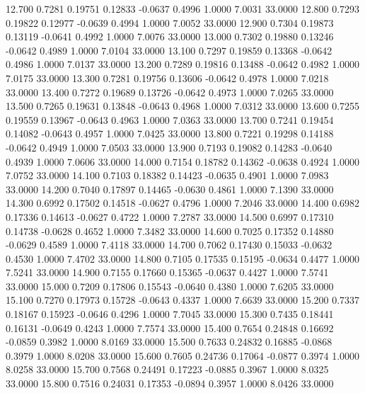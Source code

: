   12.700   0.7281   0.19751   0.12833  -0.0637   0.4996   1.0000   7.0031  33.0000
  12.800   0.7293   0.19822   0.12977  -0.0639   0.4994   1.0000   7.0052  33.0000
  12.900   0.7304   0.19873   0.13119  -0.0641   0.4992   1.0000   7.0076  33.0000
  13.000   0.7302   0.19880   0.13246  -0.0642   0.4989   1.0000   7.0104  33.0000
  13.100   0.7297   0.19859   0.13368  -0.0642   0.4986   1.0000   7.0137  33.0000
  13.200   0.7289   0.19816   0.13488  -0.0642   0.4982   1.0000   7.0175  33.0000
  13.300   0.7281   0.19756   0.13606  -0.0642   0.4978   1.0000   7.0218  33.0000
  13.400   0.7272   0.19689   0.13726  -0.0642   0.4973   1.0000   7.0265  33.0000
  13.500   0.7265   0.19631   0.13848  -0.0643   0.4968   1.0000   7.0312  33.0000
  13.600   0.7255   0.19559   0.13967  -0.0643   0.4963   1.0000   7.0363  33.0000
  13.700   0.7241   0.19454   0.14082  -0.0643   0.4957   1.0000   7.0425  33.0000
  13.800   0.7221   0.19298   0.14188  -0.0642   0.4949   1.0000   7.0503  33.0000
  13.900   0.7193   0.19082   0.14283  -0.0640   0.4939   1.0000   7.0606  33.0000
  14.000   0.7154   0.18782   0.14362  -0.0638   0.4924   1.0000   7.0752  33.0000
  14.100   0.7103   0.18382   0.14423  -0.0635   0.4901   1.0000   7.0983  33.0000
  14.200   0.7040   0.17897   0.14465  -0.0630   0.4861   1.0000   7.1390  33.0000
  14.300   0.6992   0.17502   0.14518  -0.0627   0.4796   1.0000   7.2046  33.0000
  14.400   0.6982   0.17336   0.14613  -0.0627   0.4722   1.0000   7.2787  33.0000
  14.500   0.6997   0.17310   0.14738  -0.0628   0.4652   1.0000   7.3482  33.0000
  14.600   0.7025   0.17352   0.14880  -0.0629   0.4589   1.0000   7.4118  33.0000
  14.700   0.7062   0.17430   0.15033  -0.0632   0.4530   1.0000   7.4702  33.0000
  14.800   0.7105   0.17535   0.15195  -0.0634   0.4477   1.0000   7.5241  33.0000
  14.900   0.7155   0.17660   0.15365  -0.0637   0.4427   1.0000   7.5741  33.0000
  15.000   0.7209   0.17806   0.15543  -0.0640   0.4380   1.0000   7.6205  33.0000
  15.100   0.7270   0.17973   0.15728  -0.0643   0.4337   1.0000   7.6639  33.0000
  15.200   0.7337   0.18167   0.15923  -0.0646   0.4296   1.0000   7.7045  33.0000
  15.300   0.7435   0.18441   0.16131  -0.0649   0.4243   1.0000   7.7574  33.0000
  15.400   0.7654   0.24848   0.16692  -0.0859   0.3982   1.0000   8.0169  33.0000
  15.500   0.7633   0.24832   0.16885  -0.0868   0.3979   1.0000   8.0208  33.0000
  15.600   0.7605   0.24736   0.17064  -0.0877   0.3974   1.0000   8.0258  33.0000
  15.700   0.7568   0.24491   0.17223  -0.0885   0.3967   1.0000   8.0325  33.0000
  15.800   0.7516   0.24031   0.17353  -0.0894   0.3957   1.0000   8.0426  33.0000

